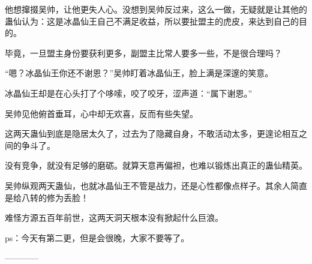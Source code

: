 \begin{this_body}
他想撺掇吴帅，让他更失人心。没想到吴帅反过来，这么一做，无疑就是让其他的蛊仙认为：这是冰晶仙王自己不满足收益，所以要扯盟主的虎皮，来达到自己的目的。

毕竟，一旦盟主身份要获利更多，副盟主比常人要多一些，不是很合理吗？

“嗯？冰晶仙王你还不谢恩？”吴帅盯着冰晶仙王，脸上满是深邃的笑意。

冰晶仙王却是在心头打了个哆嗦，咬了咬牙，涩声道：“属下谢恩。”

吴帅见他俯首垂耳，心中却无欢喜，反而有些失望。

这两天蛊仙到底是隐居太久了，过去为了隐藏自身，不敢活动太多，更遑论相互之间的争斗了。

没有竞争，就没有足够的磨砺。就算天意再偏袒，也难以锻炼出真正的蛊仙精英。

吴帅纵观两天蛊仙，也就冰晶仙王不管是战力，还是心性都像点样子。其余人简直是给八转的修为丢脸！

难怪方源五百年前世，这两天洞天根本没有掀起什么巨浪。

ps：今天有第二更，但是会很晚，大家不要等了。

------------

\end{this_body}

